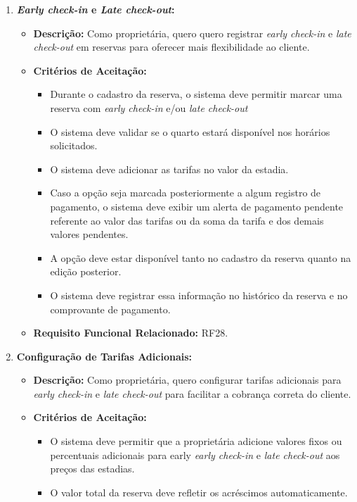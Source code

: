 \documentclass[
	12pt,				%
	openany,			%
	oneside,			%
	a4paper,			%
	english,			%
	french,				%
	spanish,			%
	brazil				%
	]{abntex2}
\begin{document}
\begin{enumerate}[label=\textbf{\arabic*.}]
	\item \textbf{\textit{Early check-in} e \textit{Late check-out}:}
	\begin{itemize}
		\item \textbf{Descrição:}  Como proprietária, quero quero registrar \textit{early check-in} e \textit{late check-out} em reservas para oferecer mais flexibilidade ao cliente.
		\item \textbf{Critérios de Aceitação:}
		\begin{itemize}
			\item Durante o cadastro da reserva, o sistema deve permitir marcar uma reserva com \textit{early check-in} e/ou \textit{late check-out}
			\item O sistema deve validar se o quarto estará disponível nos horários solicitados.
			\item O sistema deve adicionar as tarifas no valor da estadia.
			\item Caso a opção seja marcada posteriormente a algum registro de pagamento, o sistema deve exibir um alerta de pagamento pendente referente ao valor das tarifas ou da soma da tarifa e dos demais valores pendentes.
			\item A opção deve estar disponível tanto no cadastro da reserva quanto na edição posterior.
			\item O sistema deve registrar essa informação no histórico da reserva e no comprovante de pagamento.
		\end{itemize}
		\item \textbf{Requisito Funcional Relacionado:} RF28.
	\end{itemize} 
	\item \textbf{Configuração de Tarifas Adicionais:}
	\begin{itemize}
		\item \textbf{Descrição:} Como proprietária, quero configurar tarifas adicionais para \textit{early check-in} e \textit{late check-out} para facilitar a cobrança correta do cliente.
		\item \textbf{Critérios de Aceitação:}
		\begin{itemize}
			\item O sistema deve permitir que a proprietária adicione valores fixos ou percentuais adicionais para early \textit{early check-in} e \textit{late check-out} aos preços das estadias.
			\item O valor total da reserva deve refletir os acréscimos automaticamente.
		\end{itemize}

\end{itemize}
\end{enumerate}
\end{document}
